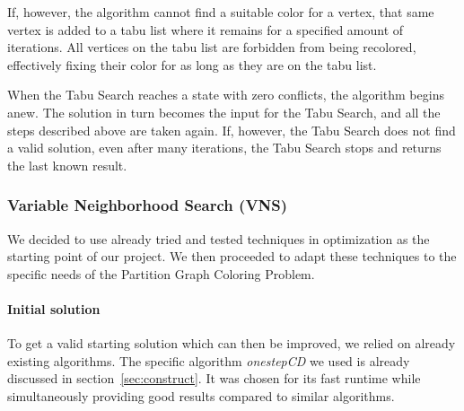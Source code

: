 \documentclass[paper=a4,fontsize=12pt]{scrartcl}
\begin{document}
{If, however, the algorithm cannot find a suitable color for a vertex, that same vertex is added to a tabu list where it remains for a specified amount of iterations. All vertices on the tabu list are forbidden from being recolored, effectively fixing their color for as long as they are on the tabu list.


When the Tabu Search reaches a state with zero conflicts, the algorithm begins anew. The solution in turn becomes the input for the Tabu Search, and all the steps described above are taken again. If, however, the Tabu Search does not find a valid solution, even after many iterations, the Tabu Search stops and returns the last known result.}


\subsubsection{Variable Neighborhood Search (VNS)}
We decided to use already tried and tested techniques in optimization as the starting point of our project. We then proceeded to adapt these techniques to the specific needs of the Partition Graph Coloring Problem.


\paragraph{Initial solution}{
To get a valid starting solution which can then be improved, we relied on already existing algorithms. The specific algorithm \emph{onestepCD} we used is already discussed in section~\ref{sec:construct}. It was chosen for its fast runtime while simultaneously providing good results compared to similar algorithms.

}
\end{document}
